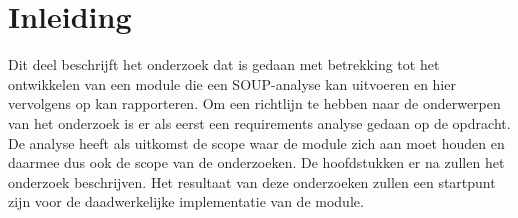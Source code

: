 
\chapter{Inleiding}\label{ch:inleiding3}
Dit deel beschrijft het onderzoek dat is gedaan met betrekking tot het ontwikkelen van een module die een SOUP-analyse kan uitvoeren en hier vervolgens op kan rapporteren. Om een richtlijn te hebben naar de onderwerpen van het onderzoek is er als eerst een requirements analyse gedaan op de opdracht. De analyse heeft als uitkomst de scope waar de module zich aan moet houden en daarmee dus ook de scope van de onderzoeken. De hoofdstukken er na zullen het onderzoek beschrijven. Het resultaat van deze onderzoeken zullen een startpunt zijn voor de daadwerkelijke implementatie van de module.

